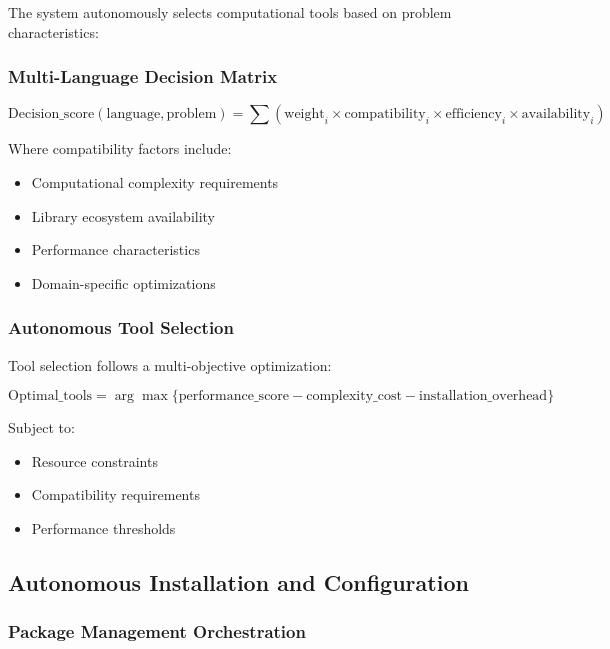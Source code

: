 \documentclass[11pt,a4paper]{article}
\begin{document}
The system autonomously selects computational tools based on problem characteristics:

\subsubsection{Multi-Language Decision Matrix}

\begin{equation}
\text{Decision\_score}(\text{language}, \text{problem}) = \sum(\text{weight}_i \times \text{compatibility}_i \times \text{efficiency}_i \times \text{availability}_i)
\end{equation}

Where compatibility factors include:
\begin{itemize}
\item Computational complexity requirements
\item Library ecosystem availability
\item Performance characteristics
\item Domain-specific optimizations
\end{itemize}

\subsubsection{Autonomous Tool Selection}

Tool selection follows a multi-objective optimization:

\begin{equation}
\text{Optimal\_tools} = \arg\max\{\text{performance\_score} - \text{complexity\_cost} - \text{installation\_overhead}\}
\end{equation}

Subject to:
\begin{itemize}
\item Resource constraints
\item Compatibility requirements
\item Performance thresholds
\end{itemize}

\subsection{Autonomous Installation and Configuration}

\subsubsection{Package Management Orchestration}
\end{document}
